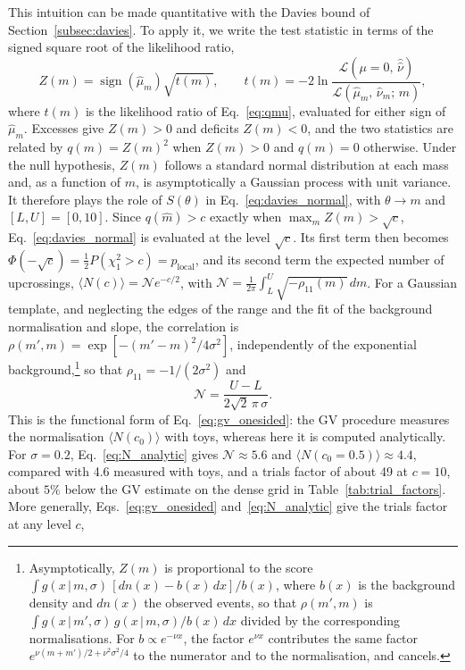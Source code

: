 This intuition can be made quantitative with the Davies bound of Section~\ref{subsec:davies}. To apply it, we write the test statistic in terms of the signed square root of the likelihood ratio,
\begin{equation}
  Z(m)=\operatorname{sign}(\hat\mu_m)\sqrt{t(m)},\qquad
  t(m)=-2\ln\frac{\mathcal{L}(\mu=0,\,\hat{\hat{\nu}})}{\mathcal{L}(\hat\mu_m,\,\hat\nu_m;\,m)},
  \label{eq:Zm}
\end{equation}
where $t(m)$ is the likelihood ratio of Eq.~\eqref{eq:qmu}, evaluated for either sign of $\hat\mu_m$. Excesses give $Z(m)>0$ and deficits $Z(m)<0$, and the two statistics are related by $q(m)=Z(m)^2$ when $Z(m)>0$ and $q(m)=0$ otherwise. Under the null hypothesis, $Z(m)$ follows a standard normal distribution at each mass and, as a function of $m$, is asymptotically a Gaussian process with unit variance. It therefore plays the role of $S(\theta)$ in Eq.~\eqref{eq:davies_normal}, with $\theta\to m$ and $[L,U]=[0,10]$. Since $q(\hat m)>c$ exactly when $\max_m Z(m)>\sqrt{c}$, Eq.~\eqref{eq:davies_normal} is evaluated at the level $\sqrt{c}$. Its first term then becomes $\Phi(-\sqrt{c})=\tfrac12P(\chi^2_1>c)=p_\text{local}$, and its second term the expected number of upcrossings, $\langle N(c)\rangle=\mathcal{N}e^{-c/2}$, with $\mathcal{N}=\frac{1}{2\pi}\int_L^U\sqrt{-\rho_{11}(m)}\,dm$. For a Gaussian template, and neglecting the edges of the range and the fit of the background normalisation and slope, the correlation is $\rho(m',m)=\exp[-(m'-m)^2/4\sigma^2]$, independently of the exponential background,\footnote{Asymptotically, $Z(m)$ is proportional to the score $\int g(x\,|\,m,\sigma)\,[dn(x)-b(x)\,dx]/b(x)$, where $b(x)$ is the background density and $dn(x)$ the observed events, so that $\rho(m',m)$ is $\int g(x\,|\,m',\sigma)\,g(x\,|\,m,\sigma)/b(x)\,dx$ divided by the corresponding normalisations. For $b\propto e^{-\nu x}$, the factor $e^{\nu x}$ contributes the same factor $e^{\nu(m+m')/2+\nu^2\sigma^2/4}$ to the numerator and to the normalisation, and cancels.} so that $\rho_{11}=-1/(2\sigma^2)$ and
\begin{equation}
  \mathcal{N}=\frac{U-L}{2\sqrt{2}\,\pi\,\sigma}.
  \label{eq:N_analytic}
\end{equation}
This is the functional form of Eq.~\eqref{eq:gv_onesided}: the GV procedure measures the normalisation $\langle N(c_0)\rangle$ with toys, whereas here it is computed analytically. For $\sigma=0.2$, Eq.~\eqref{eq:N_analytic} gives $\mathcal{N}\approx5.6$ and $\langle N(c_0{=}0.5)\rangle\approx4.4$, compared with 4.6 measured with toys, and a trials factor of about 49 at $c=10$, about $5\%$ below the GV estimate on the dense grid in Table~\ref{tab:trial_factors}. More generally, Eqs.~\eqref{eq:gv_onesided} and~\eqref{eq:N_analytic} give the trials factor at any level $c$,
